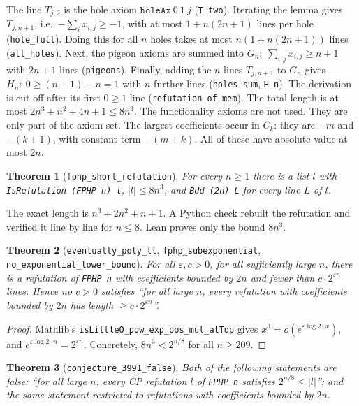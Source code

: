 \documentclass[11pt]{article}
\newtheorem{theorem}{Theorem}
\theoremstyle{definition}
\begin{document}
The line $T_{j,2}$ is the hole axiom $\texttt{holeAx}\ 0\ 1\ j$ (\texttt{T\_two}). Iterating the lemma
gives $T_{j,n+1}$, i.e.\ $-\sum_i x_{i,j}\ge-1$, with at most $1+n(2n+1)$ lines per hole
(\texttt{hole\_full}). Doing this for all $n$ holes takes at most $n(1+n(2n+1))$ lines (\texttt{all\_holes}).
Next, the pigeon axioms are summed into $G_n:\ \sum_{i,j}x_{i,j}\ge n+1$ with $2n+1$ lines
(\texttt{pigeons}). Finally, adding the $n$ lines $T_{j,n+1}$ to $G_n$ gives
$H_n:\ 0\ge (n+1)-n=1$ with $n$ further lines (\texttt{holes\_sum}, \texttt{H\_n}). The derivation is cut
off after its first $0\ge1$ line (\texttt{refutation\_of\_mem}). The total length is at most
$2n^3+n^2+4n+1\le 8n^3$. The functionality axioms are not used. They are only part of the axiom set.
The largest coefficients occur in $C_k$: they are $-m$ and $-(k+1)$, with constant term $-(m+k)$. All
of these have absolute value at most $2n$.

\begin{theorem}[\texttt{fphp\_short\_refutation}]
For every $n\ge 1$ there is a list $l$ with \texttt{IsRefutation (FPHP n) l}, $|l|\le 8n^3$, and
\texttt{Bdd (2n) L} for every line $L$ of $l$.
\end{theorem}

The exact length is $n^3+2n^2+n+1$. A Python check rebuilt the refutation and verified it line by line
for $n\le 8$. Lean proves only the bound $8n^3$.

\begin{theorem}[\texttt{eventually\_poly\_lt}, \texttt{fphp\_subexponential}, \texttt{no\_exponential\_lower\_bound}]
For all $\varepsilon,c>0$, for all sufficiently large $n$, there is a refutation of \texttt{FPHP n} with
coefficients bounded by $2n$ and fewer than $c\cdot 2^{\varepsilon n}$ lines. Hence no $c>0$ satisfies
``for all large $n$, every refutation with coefficients bounded by $2n$ has length $\ge c\cdot
2^{\varepsilon n}$''.
\end{theorem}
\begin{proof}
Mathlib's \texttt{isLittleO\_pow\_exp\_pos\_mul\_atTop} gives $x^3=o(e^{\varepsilon\log 2\cdot x})$, and
$e^{\varepsilon\log2\cdot n}=2^{\varepsilon n}$. Concretely, $8n^3<2^{n/8}$ for all $n\ge 209$.
\end{proof}

\begin{theorem}[\texttt{conjecture\_3991\_false}]
Both of the following statements are false: ``for all large $n$, every CP refutation $l$ of
\texttt{FPHP n} satisfies $2^{n/8}\le|l|$''; and the same statement restricted to refutations with
coefficients bounded by $2n$.
\end{theorem}
\end{document}
